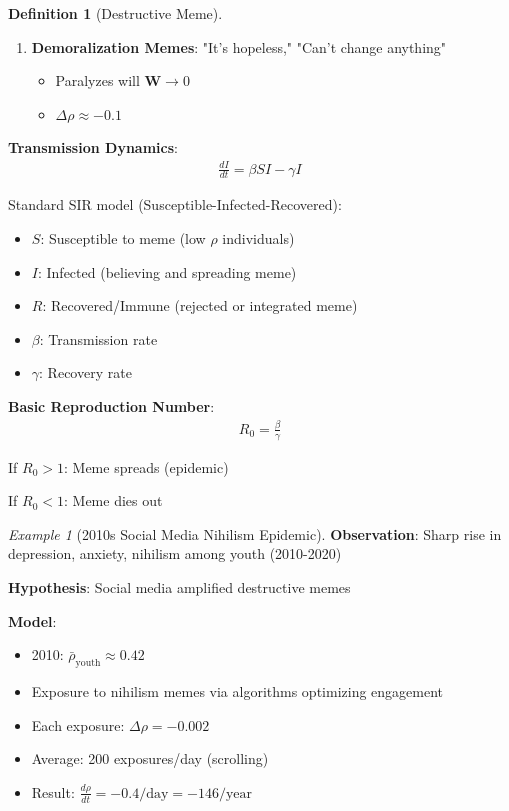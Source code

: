 \documentclass[11pt,a4paper]{article}
\theoremstyle{definition}
\newtheorem{definition}{Definition}[section]
\theoremstyle{remark}
\newtheorem{example}{Example}[section]
\newcommand{\WW}{\mathbf{W}}
\begin{document}
\begin{enumerate}
\begin{definition}[Destructive Meme]
\begin{enumerate}
    \item \textbf{Demoralization Memes}: "It's hopeless," "Can't change anything"
        \begin{itemize}
            \item Paralyzes will \(\WW \to 0\)
            \item \(\Delta\rho \approx -0.1\)
        \end{itemize}
\end{enumerate}

\textbf{Transmission Dynamics}:
\begin{align}
\frac{dI}{dt} = \beta S I - \gamma I
\end{align}

Standard SIR model (Susceptible-Infected-Recovered):
\begin{itemize}
    \item \(S\): Susceptible to meme (low \(\rho\) individuals)
    \item \(I\): Infected (believing and spreading meme)
    \item \(R\): Recovered/Immune (rejected or integrated meme)
    \item \(\beta\): Transmission rate
    \item \(\gamma\): Recovery rate
\end{itemize}

\textbf{Basic Reproduction Number}:
\begin{align}
R_0 = \frac{\beta}{\gamma}
\end{align}

If \(R_0 > 1\): Meme spreads (epidemic)

If \(R_0 < 1\): Meme dies out
\end{definition}

\begin{example}[2010s Social Media Nihilism Epidemic]
\textbf{Observation}: Sharp rise in depression, anxiety, nihilism among youth (2010-2020)

\textbf{Hypothesis}: Social media amplified destructive memes

\textbf{Model}:
\begin{itemize}
    \item 2010: \(\bar{\rho}_{\text{youth}} \approx 0.42\)
    \item Exposure to nihilism memes via algorithms optimizing engagement
    \item Each exposure: \(\Delta\rho = -0.002\)
    \item Average: 200 exposures/day (scrolling)
    \item Result: \(\frac{d\rho}{dt} = -0.4/\text{day} = -146/\text{year}\)
\end{itemize}


\end{example}
\end{enumerate}
\end{document}
